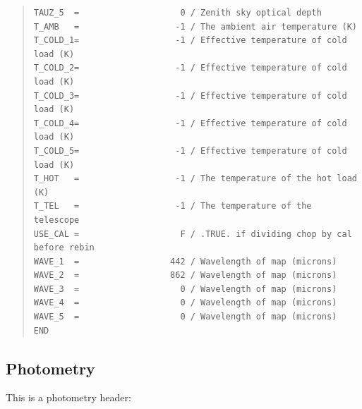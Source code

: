 \documentclass[twoside,11pt]{article}
\newenvironment{myquote}{\begin{quote}\begin{small}}{\end{small}\end{quote}}
\renewcommand{\_}{\texttt{\symbol{95}}}
\begin{document}
\begin{myquote}
\begin{verbatim}
TAUZ_5  =                    0 / Zenith sky optical depth
T_AMB   =                   -1 / The ambient air temperature (K)
T_COLD_1=                   -1 / Effective temperature of cold load (K)
T_COLD_2=                   -1 / Effective temperature of cold load (K)
T_COLD_3=                   -1 / Effective temperature of cold load (K)
T_COLD_4=                   -1 / Effective temperature of cold load (K)
T_COLD_5=                   -1 / Effective temperature of cold load (K)
T_HOT   =                   -1 / The temperature of the hot load (K)
T_TEL   =                   -1 / The temperature of the telescope
USE_CAL =                    F / .TRUE. if dividing chop by cal before rebin
WAVE_1  =                  442 / Wavelength of map (microns)
WAVE_2  =                  862 / Wavelength of map (microns)
WAVE_3  =                    0 / Wavelength of map (microns)
WAVE_4  =                    0 / Wavelength of map (microns)
WAVE_5  =                    0 / Wavelength of map (microns)
END
\end{verbatim}
\end{myquote}

\subsection{Photometry}

This is a photometry header:
\end{document}
